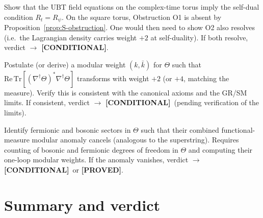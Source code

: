 \documentclass[12pt,a4paper]{article}
\theoremstyle{definition}
\theoremstyle{remark}
\newcommand{\PROVED}{\textcolor{green!50!black}{\textbf{[PROVED]}}}
\newcommand{\COND}{\textcolor{blue!70!black}{\textbf{[CONDITIONAL]}}}
\newcommand{\Tr}{\mathrm{Tr}}
\newcommand{\Real}{\mathrm{Re}}
\begin{document}
\begin{description}[leftmargin=2.2cm, style=nextline]
\item[Path A — Self-dual constraint]
  Show that the UBT field equations on the complex-time torus imply the
  self-dual condition $R_t=R_\psi$.  On the square torus, Obstruction O1
  is absent by Proposition~\ref{prop:S-obstruction}.  One would then need
  to show O2 also resolves (i.e.\ the Lagrangian density carries weight
  $+2$ at self-duality). If both resolve, verdict $\to$ \COND.

\item[Path B — Weight assignment for $\Theta$]
  Postulate (or derive) a modular weight $(k,\bar k)$ for $\Theta$ such
  that $\Real\,\Tr[(\nabla^\dagger\Theta)^\ast\nabla^\dagger\Theta]$ transforms
  with weight $+2$ (or $+4$, matching the measure).  Verify this is
  consistent with the canonical axioms and the GR/SM limits.  If consistent,
  verdict $\to$ \COND\ (pending verification of the limits).

\item[Path C — Anomaly cancellation]
  Identify fermionic and bosonic sectors in $\Theta$ such that their
  combined functional-measure modular anomaly cancels (analogous to the
  superstring).  Requires counting of bosonic and fermionic degrees of
  freedom in $\Theta$ and computing their one-loop modular weights.
  If the anomaly vanishes, verdict $\to$ \COND\ or \PROVED.
\end{description}

\section{Summary and verdict}
\label{sec:verdict}
\end{document}
